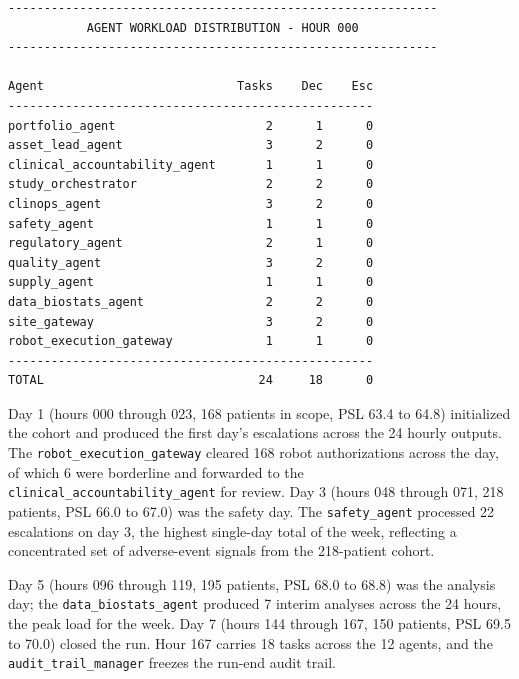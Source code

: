 \begin{verbatim}
------------------------------------------------------------
           AGENT WORKLOAD DISTRIBUTION - HOUR 000
------------------------------------------------------------

Agent                           Tasks    Dec    Esc
---------------------------------------------------
portfolio_agent                     2      1      0
asset_lead_agent                    3      2      0
clinical_accountability_agent       1      1      0
study_orchestrator                  2      2      0
clinops_agent                       3      2      0
safety_agent                        1      1      0
regulatory_agent                    2      1      0
quality_agent                       3      2      0
supply_agent                        1      1      0
data_biostats_agent                 2      2      0
site_gateway                        3      2      0
robot_execution_gateway             1      1      0
---------------------------------------------------
TOTAL                              24     18      0
\end{verbatim}

Day 1 (hours 000 through 023, 168 patients in scope, PSL 63.4 to
64.8) initialized the cohort and produced the first day's escalations
across the 24 hourly outputs. The
\texttt{robot\_execution\_gateway} cleared 168 robot authorizations
across the day, of which 6 were borderline and forwarded to the
\texttt{clinical\_accountability\_agent} for review. Day 3 (hours 048
through 071, 218 patients, PSL 66.0 to 67.0) was the safety day. The
\texttt{safety\_agent} processed 22 escalations on day 3, the highest
single-day total of the week, reflecting a concentrated set of
adverse-event signals from the 218-patient cohort.

Day 5 (hours 096 through 119, 195 patients, PSL 68.0 to 68.8) was
the analysis day; the \texttt{data\_biostats\_agent} produced 7
interim analyses across the 24 hours, the peak load for the week.
Day 7 (hours 144 through 167, 150 patients, PSL 69.5 to 70.0) closed
the run. Hour 167 carries 18 tasks across the 12 agents, and the
\texttt{audit\_trail\_manager} freezes the run-end audit trail.

